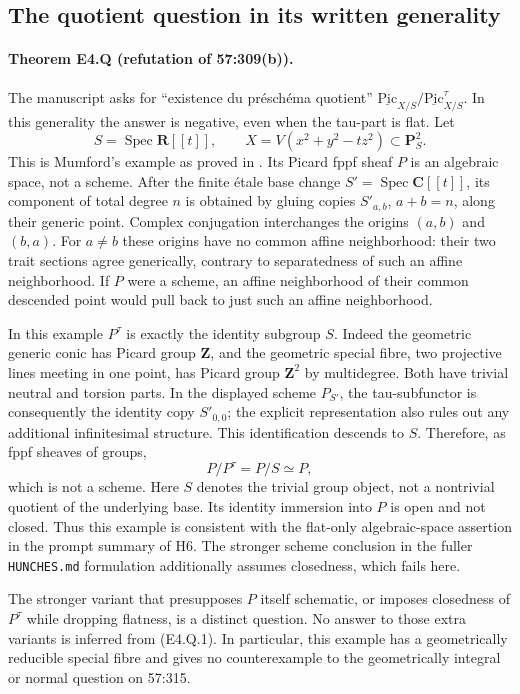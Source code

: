 \subsection{The quotient question in its written generality}

\paragraph{Theorem E4.Q (refutation of 57:309(b)).}
The manuscript asks for ``existence du pr\'esch\'ema quotient''
$\underline{\mathrm{Pic}}_{X/S}/\underline{\mathrm{Pic}}^\tau_{X/S}$.
In this generality the answer is negative, even when the tau-part is flat.
Let
\[
 S=\operatorname{Spec}\mathbf R[[t]],\qquad
 X=V(x^2+y^2-tz^2)\subset\mathbf P^2_S .                  \tag{E4.Q.1}
\]
This is Mumford's example as proved in
\cite[Example~4.14, pp.~31--33]{Kleiman2005}. Its Picard fppf sheaf
$P$ is an algebraic space, not a scheme. After the finite \'etale base change
$S'=\operatorname{Spec}\mathbf C[[t]]$, its component of total degree $n$
is obtained by gluing copies $S'_{a,b}$, $a+b=n$, along their generic point.
Complex conjugation interchanges the origins $(a,b)$ and $(b,a)$.
For $a\ne b$ these origins have no common affine neighborhood: their two
trait sections agree generically, contrary to separatedness of such an
affine neighborhood. If $P$ were a scheme, an affine neighborhood of their
common descended point would pull back to just such an affine neighborhood.

In this example $P^\tau$ is exactly the identity subgroup $S$. Indeed the
geometric generic conic has Picard group $\mathbf Z$, and the geometric
special fibre, two projective lines meeting in one point, has Picard group
$\mathbf Z^2$ by multidegree. Both have trivial neutral and torsion parts.
In the displayed scheme $P_{S'}$, the tau-subfunctor is consequently the
identity copy $S'_{0,0}$; the explicit representation also rules out any
additional infinitesimal structure. This identification descends to $S$.
Therefore, as fppf sheaves of groups,
\[
 P/P^\tau=P/S\simeq P,
\]
which is not a scheme. Here $S$ denotes the trivial group object, not a
nontrivial quotient of the underlying base. Its identity immersion into
$P$ is open and not closed. Thus this example is consistent with the flat-only algebraic-space assertion
in the prompt summary of H6. The stronger scheme conclusion in the fuller
\texttt{HUNCHES.md} formulation additionally assumes closedness, which fails here.

The stronger variant that presupposes $P$ itself schematic, or imposes
closedness of $P^\tau$ while dropping flatness, is a distinct question.
No answer to those extra variants is inferred from (E4.Q.1). In particular,
this example has a geometrically reducible special fibre and gives no
counterexample to the geometrically integral or normal question on 57:315.

